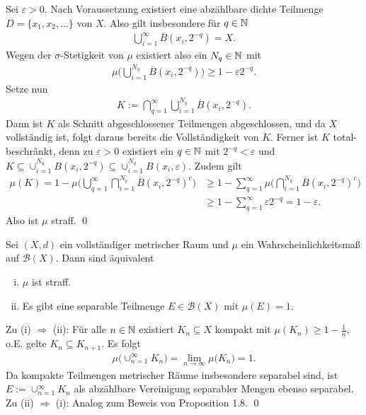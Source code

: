 \begin{proof*}
    Sei $\varepsilon > 0$. Nach Voraussetzung existiert eine abzählbare dichte Teilmenge $D = \{x_1, x_2,...\}$ von $X$. Also gilt insbesondere für $q \in \mathbb{N} $
    \begin{align*}
        \bigcup_{i = 1}^{\infty}\overline{B}(x_i, 2^{-q}) = X.
    \end{align*}
    Wegen der $\sigma$-Stetigkeit von $\mu$ existiert also ein $N_q \in \mathbb{N}$ mit 
    \begin{align*}
        \mu\big(\bigcup_{i=1}^{N_q}\overline{B}(x_i, 2^{-q})\big) \geq 1 - \varepsilon 2^{-q}. 
    \end{align*}
    Setze nun 
    \begin{align*}
        K := \bigcap_{q = 1}^{\infty}\bigcup_{i=1}^{N_q}\overline{B}(x_i, 2^{-q}). 
    \end{align*}
    Dann ist $K$ als Schnitt abgeschlossener Teilmengen abgeschlossen, und da $X$ vollständig ist, folgt daraus bereits die Vollständigkeit von $K$. 
    Ferner ist $K$ total-beschränkt, denn zu $\varepsilon > 0$ existiert ein $q \in \mathbb{N}$ mit $2^{-q} < \varepsilon$ und $K \subseteq \cup_{i=1}^{N_q}B(x_i, 2^{-q}) \subseteq \cup_{i=1}^{N_q}B(x_i, \varepsilon)$. 
    Zudem gilt
    \begin{align*}
        \mu(K)  = 1 - \mu\big(\bigcup_{q = 1}^{\infty}\bigcap_{i=1}^{N_q}\overline{B}(x_i, 2^{-q})^c\big) 
                &\geq 1 - \sum_{q=1}^{\infty} \mu\big(\bigcap_{i=1}^{N_q}\overline{B}(x_i, 2^{-q})^c\big) \\\
                &\geq 1 - \sum_{q=1}^{\infty} \varepsilon 2^{-q} = 1 - \varepsilon.
    \end{align*}
    Also ist $\mu$ straff. \qed
\end{proof*}

\begin{proposition}
    Sei $(X,d)$ ein vollständiger metrischer Raum und $\mu$ ein Wahrscheinlichkeitsmaß auf $\mathcal{B}(X)$. Dann sind äquivalent
    \begin{enumerate}[(i)]
        \item $\mu$ ist straff.
        \item Es gibt eine separable Teilmenge $E \in \mathcal{B}(X)$ mit $\mu(E) = 1$. 
    \end{enumerate}
\end{proposition}
\begin{proof*}
    Zu (i) $\Rightarrow$ (ii): Für alle $n \in \mathbb{N}$ existiert $K_n \subseteq X$ kompakt mit $\mu(K_n) \geq 1 - \frac{1}{n}$, o.E. gelte $K_n \subseteq K_{n+1}$. Es folgt 
    \begin{align*}
        \mu\big(\cup_{n=1}^{\infty}K_n\big) = \lim_{n \to \infty}\mu\big(K_ n\big) = 1. 
    \end{align*}
    Da kompakte Teilmengen metrischer Räume insbesondere separabel sind, ist $E := \cup_{n=1}^{\infty}K_n$ als abzählbare Vereinigung separabler Mengen ebenso separabel. 
    \newline 
    Zu (ii) $\Rightarrow$ (i): 
    Analog zum Beweis von Proposition 1.8. \qed
\end{proof*}

